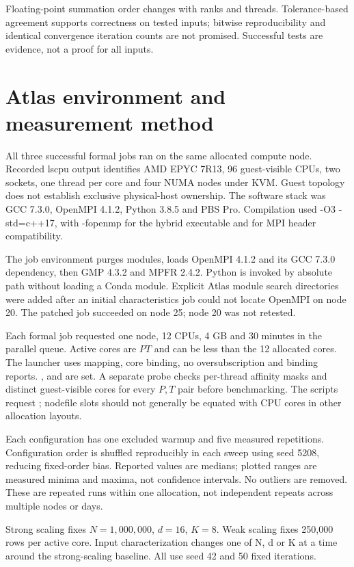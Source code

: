 \documentclass[conference,a4paper,10pt]{IEEEtran}
\begin{document}
Floating-point summation order changes with ranks and threads. Tolerance-based agreement supports correctness on tested inputs; bitwise reproducibility and identical convergence iteration counts are not promised. Successful tests are evidence, not a proof for all inputs.

\section{Atlas environment and measurement method}

All three successful formal jobs ran on the same allocated compute node. Recorded lscpu output identifies AMD EPYC 7R13, 96 guest-visible CPUs, two sockets, one thread per core and four NUMA nodes under KVM. Guest topology does not establish exclusive physical-host ownership. The software stack was GCC 7.3.0, OpenMPI 4.1.2, Python 3.8.5 and PBS Pro. Compilation used -O3 -std=c++17, with -fopenmp for the hybrid executable and  for MPI header compatibility.

The job environment purges modules, loads OpenMPI 4.1.2 and its GCC 7.3.0 dependency, then GMP 4.3.2 and MPFR 2.4.2. Python is invoked by absolute path without loading a Conda module. Explicit Atlas module search directories were added after an initial characteristics job could not locate OpenMPI on node 20. The patched job succeeded on node 25; node 20 was not retested.

Each formal job requested one node, 12 CPUs, 4 GB and 30 minutes in the parallel queue. Active cores are $P T$ and can be less than the 12 allocated cores. The launcher uses  mapping, core binding, no oversubscription and binding reports. ,  and  are set. A separate probe checks per-thread affinity masks and distinct guest-visible cores for every $P,T$ pair before benchmarking. The scripts request ; nodefile slots should not generally be equated with CPU cores in other allocation layouts.

Each configuration has one excluded warmup and five measured repetitions. Configuration order is shuffled reproducibly in each sweep using seed 5208, reducing fixed-order bias. Reported values are medians; plotted ranges are measured minima and maxima, not confidence intervals. No outliers are removed. These are repeated runs within one allocation, not independent repeats across multiple nodes or days.

Strong scaling fixes $N=1{,}000{,}000$, $d=16$, $K=8$. Weak scaling fixes 250,000 rows per active core. Input characterization changes one of N, d or K at a time around the strong-scaling baseline. All use seed 42 and 50 fixed iterations.
\end{document}
